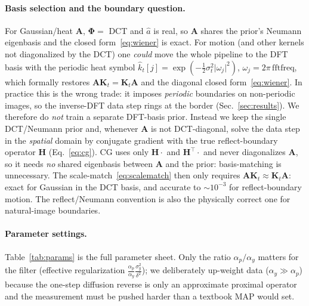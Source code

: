 \documentclass[11pt]{article}
\newcommand{\bm}[1]{\boldsymbol{#1}}  %
\newcommand{\Phimat}{\bm{\Phi}}
\newcommand{\A}{\mathbf{A}}
\newcommand{\K}{\mathbf{K}}
\begin{document}
\paragraph{Basis selection and the boundary question.}
For Gaussian/heat $\A$, $\Phimat=$ DCT and $\hat a$ is real, so $\A$ shares the prior's
Neumann eigenbasis and the closed form~\eqref{eq:wiener} is exact. For motion (and other
kernels not diagonalized by the DCT) one \emph{could} move the whole pipeline to the DFT basis
with the periodic heat symbol
$\hat k_t[j]=\exp(-\tfrac12\sigma_t^2\lvert\omega_j\rvert^2)$, $\omega_j=2\pi\,\mathrm{fftfreq}$,
which formally restores $\A\K_t=\K_t\A$ and the diagonal closed form~\eqref{eq:wiener}. In
practice this is the wrong trade: it imposes \emph{periodic} boundaries on non-periodic images,
so the inverse-DFT data step rings at the border (Sec.~\ref{sec:results}). We therefore do
\emph{not} train a separate DFT-basis prior. Instead we keep the single DCT/Neumann prior and,
whenever $\A$ is not DCT-diagonal, solve the data step in the \emph{spatial} domain by conjugate
gradient with the true reflect-boundary operator $\mathbf H$ (Eq.~\ref{eq:cg}). CG uses only
$\mathbf H\!\cdot$ and $\mathbf H^{\!\top}\!\cdot$ and never diagonalizes $\A$, so it needs
\emph{no} shared eigenbasis between $\A$ and the prior: basis-matching is unnecessary. The
scale-match~\eqref{eq:scalematch} then only requires $\A\K_t\approx\K_t\A$: exact for Gaussian in
the DCT basis, and accurate to $\sim\!10^{-3}$ for reflect-boundary motion. The reflect/Neumann
convention is also the physically correct one for natural-image boundaries.

\paragraph{Parameter settings.}
Table~\ref{tab:params} is the full parameter sheet. Only the ratio $\alpha_p/\alpha_y$
matters for the filter (effective regularization
$\tfrac{\alpha_p}{\alpha_y}\tfrac{\sigma_y^2}{\delta^2}$); we deliberately up-weight data
($\alpha_y\!\gg\!\alpha_p$) because the one-step diffusion reverse is only an approximate
proximal operator and the measurement must be pushed harder than a textbook MAP would set.
\end{document}
